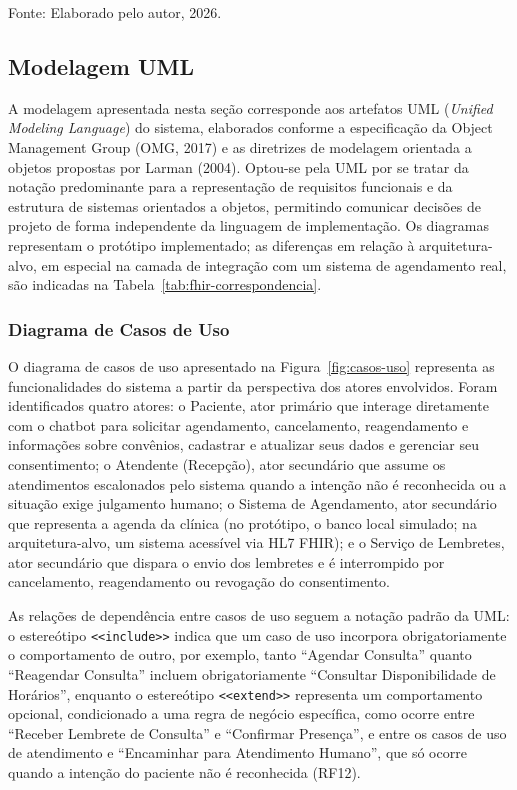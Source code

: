 \documentclass[12pt,a4paper]{extarticle}
\begin{document}
\footnotesize{Fonte: Elaborado pelo autor, 2026.}

\normalsize
\subsection{Modelagem UML}
\label{sec:modelagem-uml}

A modelagem apresentada nesta seção corresponde aos artefatos UML (\textit{Unified Modeling Language}) do sistema, elaborados conforme a especificação da Object Management Group (OMG, 2017) e as diretrizes de modelagem orientada a objetos propostas por Larman (2004). Optou-se pela UML por se tratar da notação predominante para a representação de requisitos funcionais e da estrutura de sistemas orientados a objetos, permitindo comunicar decisões de projeto de forma independente da linguagem de implementação. Os diagramas representam o protótipo implementado; as diferenças em relação à arquitetura-alvo, em especial na camada de integração com um sistema de agendamento real, são indicadas na Tabela~\ref{tab:fhir-correspondencia}.

\subsubsection{Diagrama de Casos de Uso}

O diagrama de casos de uso apresentado na Figura~\ref{fig:casos-uso} representa as funcionalidades do sistema a partir da perspectiva dos atores envolvidos. Foram identificados quatro atores: o Paciente, ator primário que interage diretamente com o chatbot para solicitar agendamento, cancelamento, reagendamento e informações sobre convênios, cadastrar e atualizar seus dados e gerenciar seu consentimento; o Atendente (Recepção), ator secundário que assume os atendimentos escalonados pelo sistema quando a intenção não é reconhecida ou a situação exige julgamento humano; o Sistema de Agendamento, ator secundário que representa a agenda da clínica (no protótipo, o banco local simulado; na arquitetura-alvo, um sistema acessível via HL7 FHIR); e o Serviço de Lembretes, ator secundário que dispara o envio dos lembretes e é interrompido por cancelamento, reagendamento ou revogação do consentimento.

As relações de dependência entre casos de uso seguem a notação padrão da UML: o estereótipo \texttt{<<include>>} indica que um caso de uso incorpora obrigatoriamente o comportamento de outro, por exemplo, tanto ``Agendar Consulta'' quanto ``Reagendar Consulta'' incluem obrigatoriamente ``Consultar Disponibilidade de Horários'', enquanto o estereótipo \texttt{<<extend>>} representa um comportamento opcional, condicionado a uma regra de negócio específica, como ocorre entre ``Receber Lembrete de Consulta'' e ``Confirmar Presença'', e entre os casos de uso de atendimento e ``Encaminhar para Atendimento Humano'', que só ocorre quando a intenção do paciente não é reconhecida (RF12).
\end{document}
